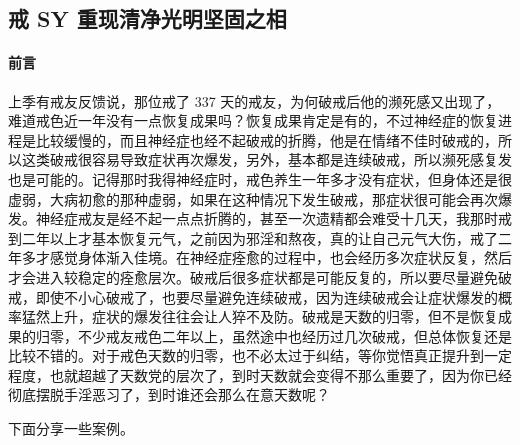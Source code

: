 \subsection{戒 SY 重现清净光明坚固之相}

\paragraph*{前言}

上季有戒友反馈说，那位戒了 337 天的戒友，为何破戒后他的濒死感又出现了，难道戒色近一年没有一点恢复成果吗？恢复成果肯定是有的，不过神经症的恢复进程是比较缓慢的，而且神经症也经不起破戒的折腾，他是在情绪不佳时破戒的，所以这类破戒很容易导致症状再次爆发，另外，基本都是连续破戒，所以濒死感复发也是可能的。记得那时我得神经症时，戒色养生一年多才没有症状，但身体还是很虚弱，大病初愈的那种虚弱，如果在这种情况下发生破戒，那症状很可能会再次爆发。神经症戒友是经不起一点点折腾的，甚至一次遗精都会难受十几天，我那时戒到二年以上才基本恢复元气，之前因为邪淫和熬夜，真的让自己元气大伤，戒了二年多才感觉身体渐入佳境。在神经症痊愈的过程中，也会经历多次症状反复，然后才会进入较稳定的痊愈层次。破戒后很多症状都是可能反复的，所以要尽量避免破戒，即使不小心破戒了，也要尽量避免连续破戒，因为连续破戒会让症状爆发的概率猛然上升，症状的爆发往往会让人猝不及防。破戒是天数的归零，但不是恢复成果的归零，不少戒友戒色二年以上，虽然途中也经历过几次破戒，但总体恢复还是比较不错的。对于戒色天数的归零，也不必太过于纠结，等你觉悟真正提升到一定程度，也就超越了天数党的层次了，到时天数就会变得不那么重要了，因为你已经彻底摆脱手淫恶习了，到时谁还会那么在意天数呢？

下面分享一些案例。

